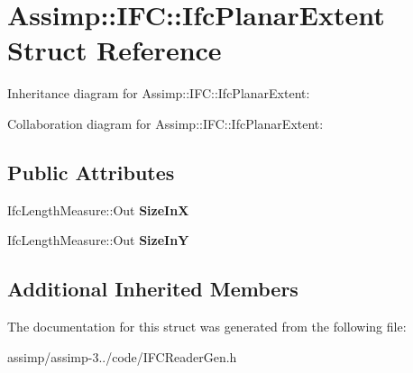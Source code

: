 \hypertarget{struct_assimp_1_1_i_f_c_1_1_ifc_planar_extent}{\section{Assimp\+:\+:I\+F\+C\+:\+:Ifc\+Planar\+Extent Struct Reference}
\label{struct_assimp_1_1_i_f_c_1_1_ifc_planar_extent}
}


Inheritance diagram for Assimp\+:\+:I\+F\+C\+:\+:Ifc\+Planar\+Extent\+:


Collaboration diagram for Assimp\+:\+:I\+F\+C\+:\+:Ifc\+Planar\+Extent\+:
\subsection*{Public Attributes}
\begin{DoxyCompactItemize}
\item 
\hypertarget{struct_assimp_1_1_i_f_c_1_1_ifc_planar_extent_a011b046caab8e2451c6e6691ab6fd422}{Ifc\+Length\+Measure\+::\+Out {\bfseries Size\+In\+X}}\label{struct_assimp_1_1_i_f_c_1_1_ifc_planar_extent_a011b046caab8e2451c6e6691ab6fd422}

\item 
\hypertarget{struct_assimp_1_1_i_f_c_1_1_ifc_planar_extent_a9bfafe3f8d253893cb8bd7bce8202d0f}{Ifc\+Length\+Measure\+::\+Out {\bfseries Size\+In\+Y}}\label{struct_assimp_1_1_i_f_c_1_1_ifc_planar_extent_a9bfafe3f8d253893cb8bd7bce8202d0f}

\end{DoxyCompactItemize}
\subsection*{Additional Inherited Members}


The documentation for this struct was generated from the following file\+:\begin{DoxyCompactItemize}
\item 
assimp/assimp-\/3../code/I\+F\+C\+Reader\+Gen.\+h\end{DoxyCompactItemize}
